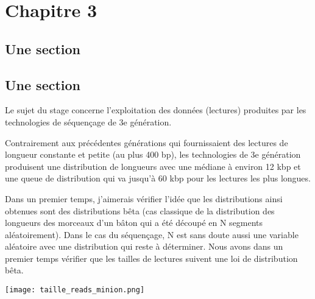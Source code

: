 \documentclass{book}
\begin{document}
	\chapter{Chapitre 3}
		\section{Une section} 
		\section{Une section}

\setcounter{tocdepth}{4}

\renewcommand{\contentsname}{Sommaire} %

\tableofcontents





Le  sujet du stage concerne l'exploitation des données (lectures)
produites par les technologies de séquençage de 3e génération.

Contrairement aux précédentes générations qui fournissaient des lectures
de longueur constante et petite (au plus 400 bp), les technologies de 3e
génération produisent une distribution de longueurs avec une médiane à
environ 12 kbp et une queue de distribution qui va jusqu'à 60 kbp pour les
lectures les plus longues.

Dans un premier temps, j'aimerais vérifier l'idée que les distributions ainsi obtenues sont des distributions bêta (cas classique de la distribution
des longueurs des morceaux d'un bâton qui a été découpé en N segments
aléatoirement). Dans le cas du séquençage, N est sans doute aussi une
variable aléatoire avec une distribution qui reste à déterminer.
Nous avons dans un premier temps vérifier que les tailles de lectures suivent une loi de distribution bêta.

\texttt{[image: taille\_reads\_minion.png]} 
\end{document}
